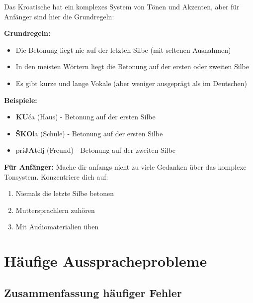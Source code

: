 \begin{tcolorbox}[colback=white, colframe=croatianred, title=\textbf{Wortbetonung}]

Das Kroatische hat ein komplexes System von Tönen und Akzenten, aber für Anfänger sind hier die Grundregeln:

\textbf{Grundregeln:}
\begin{itemize}
    \item Die Betonung liegt nie auf der letzten Silbe (mit seltenen Ausnahmen)
    \item In den meisten Wörtern liegt die Betonung auf der ersten oder zweiten Silbe
    \item Es gibt kurze und lange Vokale (aber weniger ausgeprägt als im Deutschen)
\end{itemize}

\textbf{Beispiele:}
\begin{itemize}
    \item \textbf{KU}ća (Haus) - Betonung auf der ersten Silbe
    \item \textbf{ŠKO}la (Schule) - Betonung auf der ersten Silbe
    \item pri\textbf{JA}telj (Freund) - Betonung auf der zweiten Silbe
\end{itemize}

\textbf{Für Anfänger:}
Mache dir anfangs nicht zu viele Gedanken über das komplexe Tonsystem. Konzentriere dich auf:
\begin{enumerate}
    \item Niemals die letzte Silbe betonen
    \item Muttersprachlern zuhören
    \item Mit Audiomaterialien üben
\end{enumerate}

\end{tcolorbox}

\section{Häufige Ausspracheprobleme}

\subsection{Zusammenfassung häufiger Fehler}


